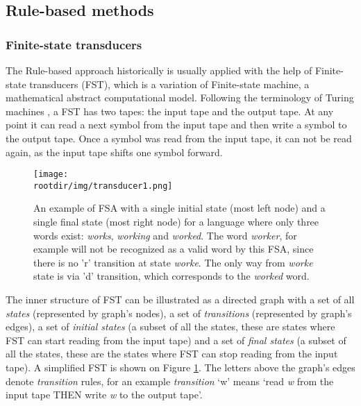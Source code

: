 \subsection{Rule-based methods}
\subsubsection{Finite-state transducers}
The Rule-based approach historically is usually applied with the help of Finite-state transducers (FST), which is a variation of Finite-state machine, a mathematical abstract computational model. Following the terminology of Turing machines \parencite{Turing_1937}, a FST has two tapes: the input tape and the output tape. At any point it can read a next symbol from the input tape and then write a symbol to the output tape. Once a symbol was read from the input tape, it can not be read again, as the input tape shifts one symbol forward. 

\begin{figure}[!h]
    \centering
    \texttt{[image: \\rootdir/img/transducer1.png]}
    \caption{An example of FSA with a single initial state (most left node) and a single final state (most right node) for a language where only three words exist: \textit{works}, \textit{working} and \textit{worked}. The word \textit{worker}, for example will not be recognized as a valid word by this FSA, since there is no 'r' transition at state \textit{worke}. The only way from \textit{worke} state is via 'd' transition, which corresponds to the \textit{worked} word. \parencite{beesley_fst_2002}}
    \label{fig:fst1}
\end{figure}


The inner structure of FST can be illustrated as a directed graph with a set of all \textit{states} (represented by graph's nodes), a set of \textit{transitions} (represented by graph's edges), a set of \textit{initial states} (a subset of all the states, these are states where FST can start reading from the input tape) and a set of \textit{final states} (a subset of all the states, these are the states where FST can stop reading from the input tape). A simplified FST is shown on Figure \ref{fig:fst1}. The letters above the graph's edges denote \textit{transition} rules, for an example \textit{transition} `w' means `read \textit{w} from the input tape THEN write \textit{w} to the output tape'.

